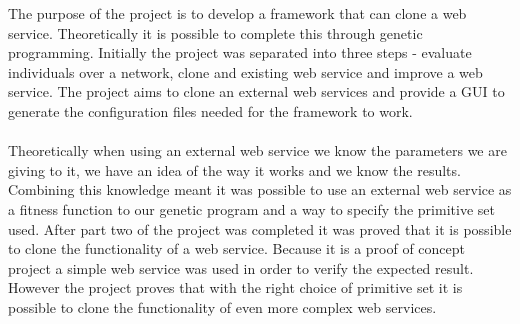 The purpose of the project is to develop a framework that can clone a web service.
Theoretically it is possible to complete this through genetic programming. Initially the project
was separated into three steps - evaluate individuals over a network, clone and existing web service and improve a
web service. The project aims to clone an external web services and provide a GUI to
generate the configuration files needed for the framework to work.
\paragraph{}
Theoretically when using an external web service we know the parameters we are giving to it, we have an idea of the way it 
works and we know the results. Combining this knowledge meant it was possible to use an external web service as a fitness
function to our genetic program and a way to specify the primitive set used. After part two of the project
was completed it was proved that it is possible to clone the functionality of a web service. Because it is a proof of concept
project a simple web service was used in order to verify the expected result. However the project proves that with the right
choice of primitive set it is possible to clone the functionality of even more complex web services.